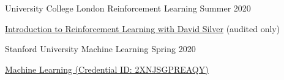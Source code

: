 \begin{cventries}
  \cventry
    {University College London} %
    {Reinforcement Learning} %
    {} %
    {Summer 2020} %
    {
      \begin{cvitems} %
      	\item {\href{https://www.youtube.com/watch?v=2pWv7GOvuf0&list=PLqYmG7hTraZBiG_XpjnPrSNw-1XQaM_gB}{Introduction to Reinforcement Learning with David Silver} (audited only)}
      \end{cvitems}
    }

  \cventry
    {Stanford University} %
    {Machine Learning} %
    {} %
    {Spring 2020} %
    {
      \begin{cvitems} %
      	\item {\href{https://www.coursera.org/account/accomplishments/Course/2XNJSGPREAQY}{Machine Learning (Credential ID: 2XNJSGPREAQY)}}
      \end{cvitems}
    }
    
\end{cventries}
